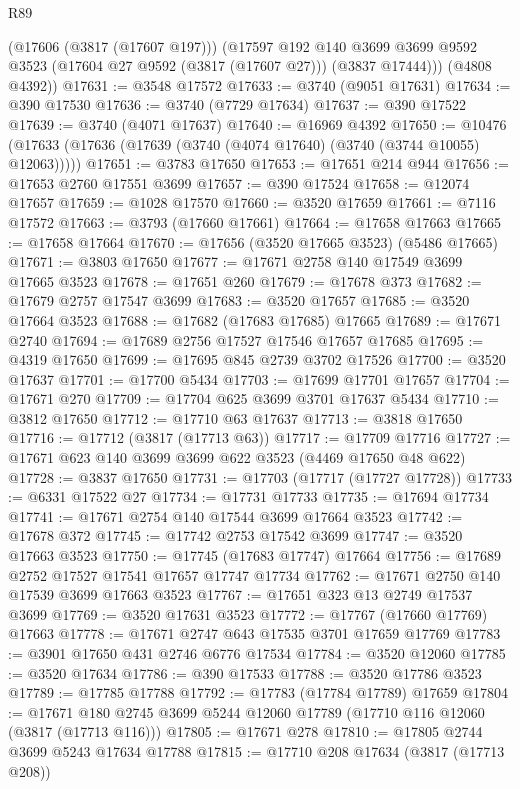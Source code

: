 \begin{lexlean}{R89}
\begin{coremodule}
        (@17606 (@3817 (@17607 @197)))
        (@17597
          @192
          @140
          @3699
          @3699
          @9592
          @3523
          (@17604 @27 @9592 (@3817 (@17607 @27)))
          (@3837 @17444)))
      (@4808 @4392))
@17631 := @3548 @17572
@17633 := @3740 (@9051 @17631)
@17634 := @390 @17530
@17636 := @3740 (@7729 @17634)
@17637 := @390 @17522
@17639 := @3740 (@4071 @17637)
@17640 := @16969 @4392
@17650 := @10476 (@17633 (@17636 (@17639 (@3740 (@4074 @17640) (@3740 (@3744 @10055) @12063)))))
@17651 := @3783 @17650
@17653 := @17651 @214 @944
@17656 := @17653 @2760 @17551 @3699
@17657 := @390 @17524
@17658 := @12074 @17657
@17659 := @1028 @17570
@17660 := @3520 @17659
@17661 := @7116 @17572
@17663 := @3793 (@17660 @17661)
@17664 := @17658 @17663
@17665 := @17658 @17664
@17670 := @17656 (@3520 @17665 @3523) (@5486 @17665)
@17671 := @3803 @17650
@17677 := @17671 @2758 @140 @17549 @3699 @17665 @3523
@17678 := @17651 @260
@17679 := @17678 @373
@17682 := @17679 @2757 @17547 @3699
@17683 := @3520 @17657
@17685 := @3520 @17664 @3523
@17688 := @17682 (@17683 @17685) @17665
@17689 := @17671 @2740
@17694 := @17689 @2756 @17527 @17546 @17657 @17685
@17695 := @4319 @17650
@17699 := @17695 @845 @2739 @3702 @17526
@17700 := @3520 @17637
@17701 := @17700 @5434
@17703 := @17699 @17701 @17657
@17704 := @17671 @270
@17709 := @17704 @625 @3699 @3701 @17637 @5434
@17710 := @3812 @17650
@17712 := @17710 @63 @17637
@17713 := @3818 @17650
@17716 := @17712 (@3817 (@17713 @63))
@17717 := @17709 @17716
@17727 := @17671 @623 @140 @3699 @3699 @622 @3523 (@4469 @17650 @48 @622)
@17728 := @3837 @17650
@17731 := @17703 (@17717 (@17727 @17728))
@17733 := @6331 @17522 @27
@17734 := @17731 @17733
@17735 := @17694 @17734
@17741 := @17671 @2754 @140 @17544 @3699 @17664 @3523
@17742 := @17678 @372
@17745 := @17742 @2753 @17542 @3699
@17747 := @3520 @17663 @3523
@17750 := @17745 (@17683 @17747) @17664
@17756 := @17689 @2752 @17527 @17541 @17657 @17747 @17734
@17762 := @17671 @2750 @140 @17539 @3699 @17663 @3523
@17767 := @17651 @323 @13 @2749 @17537 @3699
@17769 := @3520 @17631 @3523
@17772 := @17767 (@17660 @17769) @17663
@17778 := @17671 @2747 @643 @17535 @3701 @17659 @17769
@17783 := @3901 @17650 @431 @2746 @6776 @17534
@17784 := @3520 @12060
@17785 := @3520 @17634
@17786 := @390 @17533
@17788 := @3520 @17786 @3523
@17789 := @17785 @17788
@17792 := @17783 (@17784 @17789) @17659
@17804 := @17671 @180 @2745 @3699 @5244 @12060 @17789 (@17710 @116 @12060 (@3817 (@17713 @116)))
@17805 := @17671 @278
@17810 := @17805 @2744 @3699 @5243 @17634 @17788
@17815 := @17710 @208 @17634 (@3817 (@17713 @208))

\end{coremodule}
\end{lexlean}
